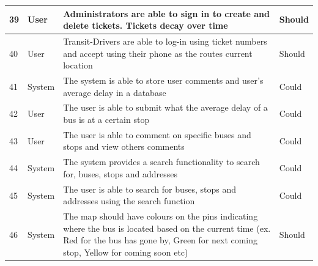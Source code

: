\documentclass[a4paper,12pt]{article}
\begin{document}
\begin{tabular}{p{0.4cm}|p{2cm}|p{8cm}|p{1.7cm}}

39 & User & Administrators are able to sign in to create and delete tickets. Tickets decay over time & Should \\
\hline
40 & User & Transit-Drivers are able to log-in using ticket numbers and accept using their phone as the routes current location & Should \\
\hline
41 & System & The system is able to store user comments and user's average delay in a database & Could \\
\hline
42 & User & The user is able to submit what the average delay of a bus is at a certain stop & Could \\
\hline
43 & User & The user is able to comment on specific buses and stops and view others comments & Could \\
\hline
44 & System & The system provides a search functionality to search for, buses, stops and addresses & Could \\
\hline
45 & System & The user is able to search for buses, stops and addresses using the search function & Could \\
\hline
46 & System & The map should have colours on the pins indicating where the bus is located based on the current time (ex. Red for the bus has gone by, Green for next coming stop, Yellow for coming soon etc) & Should
\end{tabular}
\end{document}
